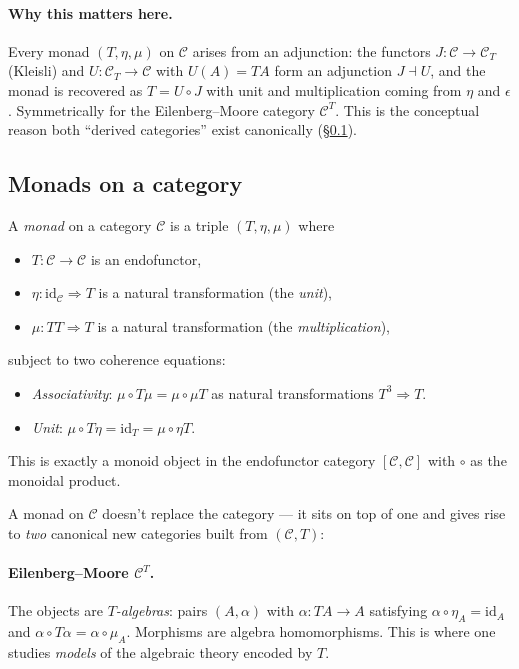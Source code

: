 \documentclass[11pt]{article}
\newcommand{\id}{\mathrm{id}}
\begin{document}
\paragraph{Why this matters here.}
Every monad $(T, \eta, \mu)$ on $\mathcal{C}$ arises from an
adjunction: the functors $J : \mathcal{C} \to \mathcal{C}_T$
(Kleisli) and $U : \mathcal{C}_T \to \mathcal{C}$ with $U(A) = T A$
form an adjunction $J \dashv U$, and the monad is recovered as
$T = U \circ J$ with unit and multiplication coming from $\eta$ and
$\epsilon$.  Symmetrically for the Eilenberg--Moore category
$\mathcal{C}^T$.  This is the conceptual reason both ``derived
categories'' exist canonically (\S\ref{sec:monads-derived}).

\subsection{Monads on a category}
\label{sec:monads-derived}

A \emph{monad} on a category $\mathcal{C}$ is a triple
$(T, \eta, \mu)$ where
\begin{itemize}
  \item $T : \mathcal{C} \to \mathcal{C}$ is an endofunctor,
  \item $\eta : \id_\mathcal{C} \Rightarrow T$ is a natural
        transformation (the \emph{unit}),
  \item $\mu : T T \Rightarrow T$ is a natural transformation (the
        \emph{multiplication}),
\end{itemize}
subject to two coherence equations:
\begin{itemize}
  \item \emph{Associativity}: $\mu \circ T\mu = \mu \circ \mu T$
        as natural transformations $T^3 \Rightarrow T$.
  \item \emph{Unit}: $\mu \circ T\eta = \id_T = \mu \circ \eta T$.
\end{itemize}
This is exactly a monoid object in the endofunctor category
$[\mathcal{C}, \mathcal{C}]$ with $\circ$ as the monoidal product.

A monad on $\mathcal{C}$ doesn't replace the category --- it sits on
top of one and gives rise to \emph{two} canonical new categories built
from $(\mathcal{C}, T)$:

\paragraph{Eilenberg--Moore $\mathcal{C}^T$.}
The objects are \emph{$T$-algebras}: pairs $(A, \alpha)$ with
$\alpha : T A \to A$ satisfying
$\alpha \circ \eta_A = \id_A$ and
$\alpha \circ T\alpha = \alpha \circ \mu_A$.  Morphisms are algebra
homomorphisms.  This is where one studies \emph{models} of the
algebraic theory encoded by $T$.
\end{document}
